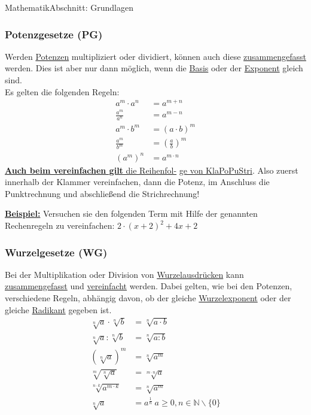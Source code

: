 \documentclass[11pt,twocolumn,oneside,openany,headings=optiontotoc,11pt,numbers=noenddot]{article}
\begin{document}
\begin{worksheet}{}{Mathematik}{Abschnitt: Grundlagen}
		\subsubsection*{Potenzgesetze (PG)}
		Werden \underline{Potenzen} multipliziert oder dividiert, können auch diese \underline{zusammengefasst} werden. Dies ist aber nur dann möglich, wenn die \underline{Basis} oder der \underline{Exponent} gleich sind.\\
		Es gelten die folgenden Regeln:
		\begin{align*}
			a^m\cdot{}a^n & = a ^{m+n}\\
			\frac{a^m}{a^n} & = a^{m-n}\\
			a^m\cdot{}b^m & = (a\cdot{}b)^m\\
			\frac{a^m}{b^m} & = \left(\frac{a}{b}\right)^m\\
			(a^m)^n & = a^{m\cdot{}n}
		\end{align*}
		\newpage
		\underline{\textbf{Auch beim vereinfachen gilt} die Reihenfol-} \underline{ge von \color{red}KlaPoPuStri\normalcolor}. Also zuerst innerhalb der Klammer vereinfachen, dann die Potenz, im Anschluss die Punktrechnung und abschließend die Strichrechnung!\\
		\par\bigskip\noindent
		\underline{\textbf{Beispiel:}} Versuchen sie den folgenden Term mit Hilfe der genannten Rechenregeln zu vereinfachen: \(2\cdot{}(x+2)^2 + 4x + 2\)
		\subsubsection*{Wurzelgesetze (WG)}
		Bei der Multiplikation oder Division von \underline{Wurzelausdrücken} kann \underline{zusammengefasst} und \underline{vereinfacht} werden. Dabei gelten, wie bei den Potenzen, verschiedene Regeln, abhängig davon, ob der gleiche \underline{Wurzelexponent} oder der gleiche \underline{Radikant} gegeben ist.
		\begin{align*}
			\sqrt[n]{a}\cdot\sqrt[n]{b} & = \sqrt[n]{a\cdot{}b}\\
			\sqrt[n]{a}:\sqrt[n]{b} & = \sqrt[n]{a:b}\\
			(\sqrt[n]{a})^m & = \sqrt[n]{a^m}\\
			\sqrt[m]{\sqrt[n]{a}} & = \sqrt[m\cdot{}n]{a}\\
			\sqrt[n\cdot{}k]{a^{m\cdot{}k}} & = \sqrt[n]{a^m}\\
			\sqrt[n]{a} & = a^{\frac{1}{n}}\ a\geq 0, n\in\mathbb{N}\backslash\{0\}
		\end{align*}

\end{worksheet}
\end{document}
